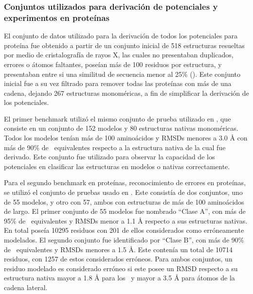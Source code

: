 \subsubsection{Conjuntos utilizados para derivación de potenciales y experimentos en proteínas}
\par
El conjunto de datos utilizado para la derivación de todos los potenciales para proteína fue obtenido a partir de un conjunto inicial de 518 estructuras resueltas por medio de cristalografía de rayos X, las cuales no presentaban duplicados, errores o átomos faltantes, poseían más de 100 residuos por estructura, y presentaban entre si una similitud de secuencia menor al 25\% (\cite{Ferrada2009}). 
Este conjunto inicial fue a su vez filtrado para remover todas las proteínas con más de una cadena, dejando 267 estructuras monoméricas, a fin de simplificar la derivación de los potenciales.
\par
El primer benchmark utilizó el mismo conjunto de prueba utilizado en \cite{Ferrada2007}, que consiste en un conjunto de 152 modelos y 80 estructuras nativas monoméricas. 
Todos los modelos tenían más de 100 aminoácidos y RMSDs menores a 3.0 \si{\angstrom} con más de 90\% de \Ca\ equivalentes respecto a la estructura nativa de la cual fue derivado. 
Este conjunto fue utilizado para observar la capacidad de los potenciales en clasificar las estructuras en modelos o nativas correctamente.
\par
Para el segundo benchmark en proteínas, reconocimiento de errores en proteínas, se utilizó el conjunto de pruebas usado en \cite{Ferrada2009}.
Este consistía de dos conjuntos, uno de 55 modelos, y otro con 57, ambos con estructuras de más de 100 aminoácidos de largo. 
El primer conjunto de 55 modelos fue nombrado ``Clase A'', con más de 95\% de \Ca\ equivalentes y RMSDs menor a 1.1 \si{\angstrom} respecto a sus estructuras nativas. 
En total poseía 10295 residuos con 201 de ellos considerados como erróneamente modelados. 
El segundo conjunto fue identificado por ``Clase B'', con más de 90\% de \Ca\ equivalentes y RMSDs menores a 1.5 \si{\angstrom}.
Este contenía un total de 10714 residuos, con 1257 de estos considerados erróneos. 
Para ambos conjuntos, un residuo modelado es considerado erróneo si este posee un RMSD respecto a su estructura nativa mayor a 1.8 \si{\angstrom} para los \Ca\ y mayor a 3.5 \si{\angstrom} para átomos de la cadena lateral.
